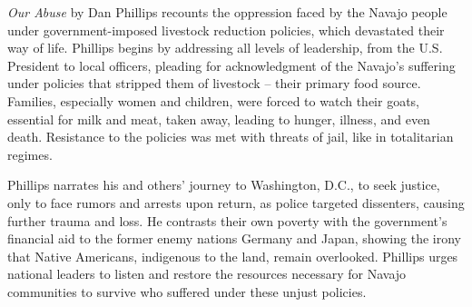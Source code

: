 \textit{Our Abuse} by Dan Phillips recounts the oppression faced by the Navajo people under government-imposed livestock reduction policies, which devastated their way of life. Phillips begins by addressing all levels of leadership, from the U.S. President to local officers, pleading for acknowledgment of the Navajo's suffering under policies that stripped them of livestock -- their primary food source. Families, especially women and children, were forced to watch their goats, essential for milk and meat, taken away, leading to hunger, illness, and even death. Resistance to the policies was met with threats of jail, like in totalitarian regimes.

Phillips narrates his and others' journey to Washington, D.C., to seek justice, only to face rumors and arrests upon return, as police targeted dissenters, causing further trauma and loss. He contrasts their own poverty with the government's financial aid to the former enemy nations Germany and Japan, showing the irony that Native Americans, indigenous to the land, remain overlooked. Phillips urges national leaders to listen and restore the resources necessary for Navajo communities to survive who suffered under these unjust policies.
